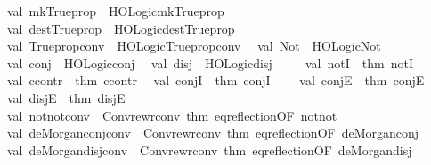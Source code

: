 \begin{isabellebody}
\ \ val\ mk{\isacharunderscore}{\kern0pt}Trueprop\ {\isacharequal}{\kern0pt}\ HOLogic{\isachardot}{\kern0pt}mk{\isacharunderscore}{\kern0pt}Trueprop\isanewline
\ \ val\ dest{\isacharunderscore}{\kern0pt}Trueprop\ {\isacharequal}{\kern0pt}\ HOLogic{\isachardot}{\kern0pt}dest{\isacharunderscore}{\kern0pt}Trueprop\isanewline
\ \ val\ Trueprop{\isacharunderscore}{\kern0pt}conv\ {\isacharequal}{\kern0pt}\ HOLogic{\isachardot}{\kern0pt}Trueprop{\isacharunderscore}{\kern0pt}conv\isanewline
\ \ val\ Not\ {\isacharequal}{\kern0pt}\ HOLogic{\isachardot}{\kern0pt}Not\isanewline
\ \ val\ conj\ {\isacharequal}{\kern0pt}\ HOLogic{\isachardot}{\kern0pt}conj\isanewline
\ \ val\ disj\ {\isacharequal}{\kern0pt}\ HOLogic{\isachardot}{\kern0pt}disj\isanewline
\ \ \isanewline
\ \ val\ notI\ {\isacharequal}{\kern0pt}\ {\isacharat}{\kern0pt}{\isacharbraceleft}{\kern0pt}thm\ notI{\isacharbraceright}{\kern0pt}\isanewline
\ \ val\ ccontr\ {\isacharequal}{\kern0pt}\ {\isacharat}{\kern0pt}{\isacharbraceleft}{\kern0pt}thm\ ccontr{\isacharbraceright}{\kern0pt}\isanewline
\ \ val\ conjI\ {\isacharequal}{\kern0pt}\ {\isacharat}{\kern0pt}{\isacharbraceleft}{\kern0pt}thm\ conjI{\isacharbraceright}{\kern0pt}\ \ \isanewline
\ \ val\ conjE\ {\isacharequal}{\kern0pt}\ {\isacharat}{\kern0pt}{\isacharbraceleft}{\kern0pt}thm\ conjE{\isacharbraceright}{\kern0pt}\isanewline
\ \ val\ disjE\ {\isacharequal}{\kern0pt}\ {\isacharat}{\kern0pt}{\isacharbraceleft}{\kern0pt}thm\ disjE{\isacharbraceright}{\kern0pt}\isanewline
\isanewline
\ \ val\ not{\isacharunderscore}{\kern0pt}not{\isacharunderscore}{\kern0pt}conv\ {\isacharequal}{\kern0pt}\ Conv{\isachardot}{\kern0pt}rewr{\isacharunderscore}{\kern0pt}conv\ {\isacharat}{\kern0pt}{\isacharbraceleft}{\kern0pt}thm\ eq{\isacharunderscore}{\kern0pt}reflection{\isacharbrackleft}{\kern0pt}OF\ not{\isacharunderscore}{\kern0pt}not{\isacharbrackright}{\kern0pt}{\isacharbraceright}{\kern0pt}\isanewline
\ \ val\ de{\isacharunderscore}{\kern0pt}Morgan{\isacharunderscore}{\kern0pt}conj{\isacharunderscore}{\kern0pt}conv\ {\isacharequal}{\kern0pt}\ Conv{\isachardot}{\kern0pt}rewr{\isacharunderscore}{\kern0pt}conv\ {\isacharat}{\kern0pt}{\isacharbraceleft}{\kern0pt}thm\ eq{\isacharunderscore}{\kern0pt}reflection{\isacharbrackleft}{\kern0pt}OF\ de{\isacharunderscore}{\kern0pt}Morgan{\isacharunderscore}{\kern0pt}conj{\isacharbrackright}{\kern0pt}{\isacharbraceright}{\kern0pt}\isanewline
\ \ val\ de{\isacharunderscore}{\kern0pt}Morgan{\isacharunderscore}{\kern0pt}disj{\isacharunderscore}{\kern0pt}conv\ {\isacharequal}{\kern0pt}\ Conv{\isachardot}{\kern0pt}rewr{\isacharunderscore}{\kern0pt}conv\ {\isacharat}{\kern0pt}{\isacharbraceleft}{\kern0pt}thm\ eq{\isacharunderscore}{\kern0pt}reflection{\isacharbrackleft}{\kern0pt}OF\ de{\isacharunderscore}{\kern0pt}Morgan{\isacharunderscore}{\kern0pt}disj{\isacharbrackright}{\kern0pt}{\isacharbraceright}{\kern0pt}\isanewline

\end{isabellebody}
